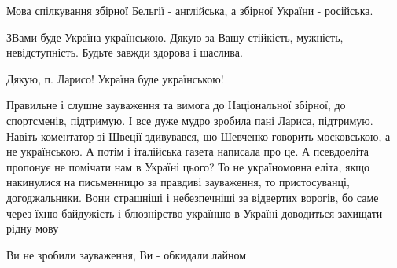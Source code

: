 \begin{itemize}
 

Мова спілкування збірної Бельгії - англійська, а збірної України - російська.

 
ЗВами буде Україна українською. Дякую за Вашу стійкість, мужність, невідступність. Будьте завжди здорова і щаслива.

 
Дякую, п. Ларисо!
Україна буде українською!

 

Правильне і слушне зауваження та вимога до Національної збірної, до
спортсменів, підтримую. І все дуже мудро зробила пані Лариса, підтримую. Навіть
коментатор зі Швеції здивувався, що Шевченко говорить московською, а не
українською. А потім і італійська газета написала про це. А псевдоеліта
пропонує не помічати нам в Україні цього? То не україномовна еліта, якщо
накинулися на письменницю за правдиві зауваження, то пристосуванці,
догоджальники. Вони страшніші і небезпечніші за відвертих ворогів, бо саме
через їхню байдужість і блюзнірство українцю в Україні доводиться захищати
рідну мову


 
Ви не зробили зауваження, Ви - обкидали лайном


\end{itemize}
